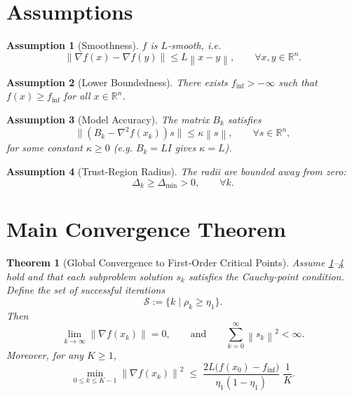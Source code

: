 \documentclass{article}
\newcommand{\R}{\mathbb{R}}
\newcommand{\norm}[1]{\left\lVert #1 \right\rVert}
\newtheorem{assumption}{Assumption}
\newtheorem{theorem}{Theorem}
\begin{document}
\newpage
\section*{Assumptions}
\begin{assumption}[Smoothness]\label{as:smooth}
$f$ is $L$‑smooth, i.e.
\[
\norm{\nabla f(x)-\nabla f(y)}\le L\norm{x-y},
\qquad\forall x,y\in\R^{n}.
\]
\end{assumption}
\begin{assumption}[Lower Boundedness]\label{as:lb}
There exists $f_{\inf}>-\infty$ such that $f(x)\ge f_{\inf}$ for all $x\in\R^{n}$.
\end{assumption}
\begin{assumption}[Model Accuracy]\label{as:model}
The matrix $B_k$ satisfies
\[
\bigl\| (B_k- \nabla^2 f(x_k))s \bigr\|\le \kappa \norm{s},
\qquad\forall s\in\R^{n},
\]
for some constant $\kappa\ge0$ (e.g. $B_k=L I$ gives $\kappa=L$).
\end{assumption}
\begin{assumption}[Trust‑Region Radius]\label{as:radius}
The radii are bounded away from zero:
\[
\Delta_k \ge \Delta_{\min}>0,\qquad\forall k.
\]
\end{assumption}

\section*{Main Convergence Theorem}
\begin{theorem}[Global Convergence to First‑Order Critical Points]\label{thm:global}
Assume \ref{as:smooth}–\ref{as:radius} hold and that each subproblem solution $s_k$ satisfies the Cauchy‑point condition.  
Define the set of successful iterations
\[
\mathcal{S}:=\{k\mid\rho_k\ge\eta_1\}.
\]
Then
\[
\lim_{k\to\infty}\norm{\nabla f(x_k)}=0,
\qquad\text{and}\qquad
\sum_{k=0}^{\infty}\norm{s_k}^2<\infty .
\]
Moreover, for any $K\ge1$,
\[
\min_{0\le k\le K-1}\norm{\nabla f(x_k)}^2
\;\le\;
\frac{2L\bigl(f(x_0)-f_{\inf}\bigr)}{\eta_1(1-\eta_1)}\;\frac{1}{K}.
\tag{1}
\]
\end{theorem}
\end{document}
